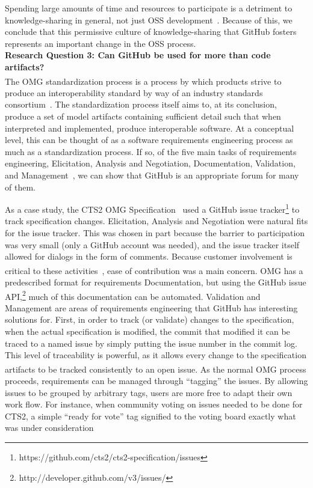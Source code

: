 \documentclass{proc}
\begin{document}
{{{{{Spending large amounts of time and resources to participate is a detriment to knowledge-sharing in general, not just OSS development~\cite{ardichvili2003motivation}. Because of this, we conclude that this permissive culture of knowledge-sharing that GitHub fosters represents an important change in the OSS process.\\

\noindent \textbf{Research Question 3: Can GitHub be used for more than code artifacts?}\\
The OMG\textsuperscript{\textregistered} standardization process is a process by which products strive to produce an interoperability standard by way of an industry standards consortium~\cite{omgTechProcess}.
The standardization process itself aims to, at its conclusion, produce a set of model artifacts containing sufficient detail such that when interpreted and implemented, produce interoperable software.
At a conceptual level, this can be thought of as a software requirements engineering process as much as a standardization process. If so, of the five main tasks of requirements engineering, Elicitation, Analysis and Negotiation, Documentation, Validation, and Management~\cite{sommerville1998requirements}, we can show that GitHub is an appropriate forum for many of them.

As a case study, the CTS2 OMG\textsuperscript{\textregistered} Specification~\cite{cts2} used a GitHub issue tracker\footnote{https://github.com/cts2/cts2-specification/issues} to track specification changes. Elicitation, Analysis and Negotiation were natural fits for the issue tracker. This was chosen in part because the barrier to participation was very small (only a GitHub account was needed), and the issue tracker itself allowed for dialogs in the form of comments. Because customer involvement is critical to these activities~\cite{paetsch2003requirements}, ease of contribution was a main concern. OMG\textsuperscript{\textregistered} has a predescribed format for requirements Documentation, but using the GitHub issue API,\footnote{http://developer.github.com/v3/issues/} much of this documentation can be automated.
Validation and Management are areas of requirements engineering that GitHub has interesting solutions for. First, in order to track (or validate) changes to the specification, when the actual specification is modified, the commit that modified it can be traced to a named issue by simply putting the issue number in the commit log. This level of traceability is powerful, as it allows every change to the specification artifacts to be tracked consistently to an open issue. As the normal OMG\textsuperscript{\textregistered} process proceeds, requirements can be managed through ``tagging'' the issues. By allowing issues to be grouped by arbitrary tags, users are more free to adapt their own work flow. For instance, when community voting on issues needed to be done for CTS2, a simple ``ready for vote'' tag signified to the voting board exactly what was under consideration

}}}}}
\end{document}
